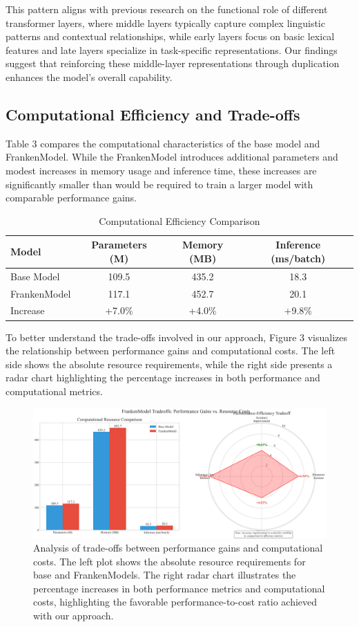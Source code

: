 \documentclass{article}
\begin{document}
This pattern aligns with previous research on the functional role of different transformer layers, where middle layers typically capture complex linguistic patterns and contextual relationships, while early layers focus on basic lexical features and late layers specialize in task-specific representations. Our findings suggest that reinforcing these middle-layer representations through duplication enhances the model's overall capability.

\subsection{Computational Efficiency and Trade-offs}
Table 3 compares the computational characteristics of the base model and FrankenModel. While the FrankenModel introduces additional parameters and modest increases in memory usage and inference time, these increases are significantly smaller than would be required to train a larger model with comparable performance gains.

\begin{table}[h]
\caption{Computational Efficiency Comparison}
\centering
\begin{tabular}{lccc}
\toprule
\textbf{Model} & \textbf{Parameters (M)} & \textbf{Memory (MB)} & \textbf{Inference (ms/batch)} \\
\midrule
Base Model & 109.5 & 435.2 & 18.3 \\
FrankenModel & 117.1 & 452.7 & 20.1 \\
\midrule
Increase & +7.0\% & +4.0\% & +9.8\% \\
\bottomrule
\end{tabular}
\end{table}

To better understand the trade-offs involved in our approach, Figure 3 visualizes the relationship between performance gains and computational costs. The left side shows the absolute resource requirements, while the right side presents a radar chart highlighting the percentage increases in both performance and computational metrics.

\begin{figure}[H]
\centering
\includegraphics[width=\textwidth]{tradeoff_visualization.png}
\caption{Analysis of trade-offs between performance gains and computational costs. The left plot shows the absolute resource requirements for base and FrankenModels. The right radar chart illustrates the percentage increases in both performance metrics and computational costs, highlighting the favorable performance-to-cost ratio achieved with our approach.}
\end{figure}
\end{document}
